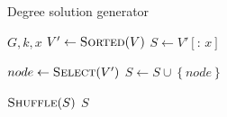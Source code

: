 \begin{algorithm}[t]
  \caption{Degree solution generator}\label{alg:DEGREE-SMART-INIT}
  \begin{algorithmic}[1]
    \Require $G, k, x$
    \State $V' \leftarrow \Call{Sorted}{V}$
    \State $S \leftarrow V'\left[ {:}\,x \right]$

    \State $node \leftarrow \Call{Select}{V'}$
    \State $S \leftarrow S \cup \left\{ node \right\}$
    \EndIf
    \EndWhile

    \State $\Call{Shuffle}{S}$
    \State \Return $S$
  \end{algorithmic}
\end{algorithm}
